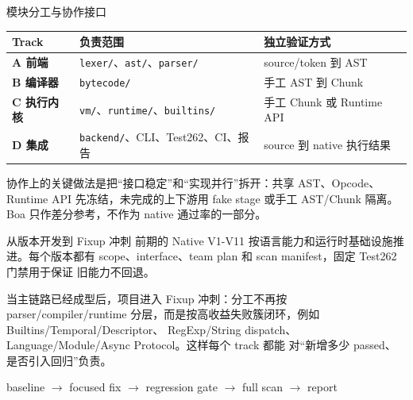 \documentclass[aspectratio=169,UTF8,fontset=windows]{ctexbeamer}
\begin{document}
\begin{frame}{模块分工与协作接口}
  \begin{tabularx}{\textwidth}{>{\bfseries}p{} X X}
    \toprule
    Track & 负责范围 & 独立验证方式 \\
    \midrule
    A 前端 & \texttt{lexer/}、\texttt{ast/}、\texttt{parser/} & source/token 到 AST \\
    B 编译器 & \texttt{bytecode/} & 手工 AST 到 Chunk \\
    C 执行内核 & \texttt{vm/}、\texttt{runtime/}、\texttt{builtins/} & 手工 Chunk 或 Runtime API \\
    D 集成 & \texttt{backend/}、CLI、Test262、CI、报告 & source 到 native 执行结果 \\
    \bottomrule
  \end{tabularx}

  \vspace{0.8em}
  协作上的关键做法是把“接口稳定”和“实现并行”拆开：共享 AST、Opcode、
  Runtime API 先冻结，未完成的上下游用 fake stage 或手工 AST/Chunk 隔离。
  Boa 只作差分参考，不作为 native 通过率的一部分。
\end{frame}

\begin{frame}{从版本开发到 Fixup 冲刺}
  前期的 Native V1-V11 按语言能力和运行时基础设施推进。每个版本都有
  scope、interface、team plan 和 scan manifest，固定 Test262 门禁用于保证
  旧能力不回退。

  \vspace{0.6em}
  当主链路已经成型后，项目进入 Fixup 冲刺：分工不再按 parser/compiler/runtime
  分层，而是按高收益失败簇闭环，例如 Builtins/Temporal/Descriptor、
  RegExp/String dispatch、Language/Module/Async Protocol。这样每个 track 都能
  对“新增多少 passed、是否引入回归”负责。

  \vspace{0.4em}
  \begin{center}
    {\small baseline \(\rightarrow\) focused fix \(\rightarrow\) regression gate \(\rightarrow\) full scan \(\rightarrow\) report}
  \end{center}
\end{frame}
\end{document}
